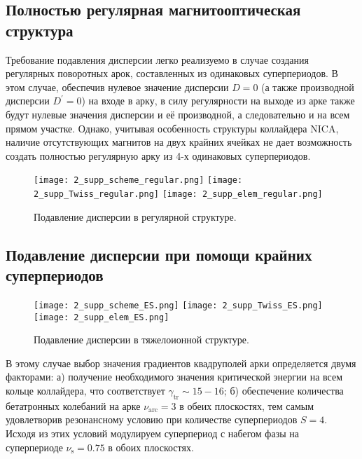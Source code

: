 \subsection{Полностью регулярная магнитооптическая структура}\label{subsec:transition_variation/disp_supperssion/regular}

\par Требование подавления дисперсии легко реализуемо в случае создания регулярных поворотных арок, составленных из одинаковых суперпериодов. В этом случае, обеспечив нулевое значение дисперсии $D=0$ (а также производной дисперсии $D^{\prime}=0$) на входе в арку, в силу регулярности на выходе из арке также будут нулевые значения дисперсии и её производной, а следовательно и на всем прямом участке. Однако, учитывая особенность структуры коллайдера NICA, наличие отсутствующих магнитов на двух крайних ячейках не дает возможность создать полностью регулярную арку из 4-х одинаковых суперпериодов.

\begin{figure} [h!]
   \center
   \texttt{[image: 2\_supp\_scheme\_regular.png]}
   \texttt{[image: 2\_supp\_Twiss\_regular.png]}
   \texttt{[image: 2\_supp\_elem\_regular.png]}
   \caption{Подавление дисперсии в регулярной структуре.}
   \label{fig:2_disp_supp_full_regular}
\end{figure}
	
\subsection{Подавление дисперсии при помощи крайних суперпериодов}\label{subsec:transition_variation/disp_supperssion/ES}

\par	
\begin{figure} [h!]
   \center
   \texttt{[image: 2\_supp\_scheme\_ES.png]}
   \texttt{[image: 2\_supp\_Twiss\_ES.png]}
   \texttt{[image: 2\_supp\_elem\_ES.png]}
   \caption{Подавление дисперсии в тяжелоионной структуре.}
   \label{fig:2_disp_supp_ES}
\end{figure}		

\par В этому случае выбор значения градиентов квадруполей арки определяется двумя факторами:
	а) получение необходимого значения критической энергии на всем кольце коллайдера, что соответствует $\gamma_{\text{tr}}\sim15-16$;
	б) обеспечение количества бетатронных колебаний на арке $\nu_{\text{arc}}=3$ в обеих плоскостях, тем самым удовлетворив резонансному условию при количестве суперпериодов $S=4$. Исходя из этих условий модулируем суперпериод с набегом фазы на суперпериоде $\nu_{\text{s}}=0.75$ в обоих плоскостях.

